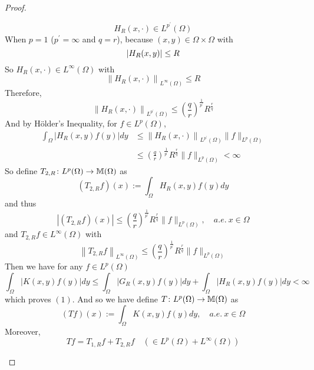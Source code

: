 \begin{proof}
\begin{enumerate}[label=(\Roman*)]
		\begin{equation*}
			H_R(x, \cdot) \in L^{p^{\prime}}(\Omega)
		\end{equation*}
		When $p = 1$ ($p^\prime = \infty$ and $q = r$), because $(x,y) \in \Omega \times \Omega$ with
		\begin{equation*}
			\left\lvert H_R(x,y)\right\lvert \leq R
		\end{equation*}
		So $H_R(x, \cdot) \in L^{\infty}(\Omega)$ with
		\begin{equation*}
			\left\|H_R(x, \cdot)\right\|_{L^{\infty}(\Omega)} \leq R
		\end{equation*}
		Therefore, 
		\begin{equation*}
			\left\|H_R(x, \cdot)\right\|_{L^{p^{\prime}}(\Omega)} \leq\left(\frac{q}{r}\right)^{\frac{1}{p^{\prime}}} R^{\frac{r}{q}}
		\end{equation*}
		And by H\"older's Inequality, for $f \in L^p(\Omega)$,
		\begin{equation*}
			\begin{aligned}
				\int_{\Omega}\left|H_R(x, y) f(y)\right| d y & \leq\left\|H_R(x, \cdot)\right\|_{L^{p^{\prime}}(\Omega)}\|f\|_{L^p(\Omega)} \\
				& \leq\left(\frac{q}{r}\right)^{\frac{1}{p^{\prime}}} R^{\frac{r}{q}}\|f\|_{L^p(\Omega)}<\infty
			\end{aligned}
		\end{equation*}
		So define $T_{2,R} \colon L^p(\Omega) \rightarrow \mathbb{M}(\Omega)$ as
		\begin{equation*}
			\left(T_{2, R} f\right)(x):=\int_{\Omega} H_R(x, y) f(y) d y
		\end{equation*}
		and thus
		\begin{equation*}
			\left|\left(T_{2, R} f\right)(x)\right| \leq\left(\frac{q}{r}\right)^{\frac{1}{p^{\prime}}} R^{\frac{r}{q}}\|f\|_{L^p(\Omega)},\quad a.e.~ x \in \Omega
		\end{equation*}
		and $T_{2,R}f \in L^\infty(\Omega)$ with
		\begin{equation*}
			\left\|T_{2, R} f\right\|_{L^{\infty}(\Omega)} \leq\left(\frac{q}{r}\right)^{\frac{1}{p^{\prime}}} R^{\frac{r}{q}}\|f\|_{L^p(\Omega)}
		\end{equation*}
		Then we have for any $f \in L^p(\Omega)$
		\begin{equation*}
			\int_{\Omega}|K(x, y) f(y)| d y \leq \int_{\Omega}\left|G_R(x, y) f(y)\right| d y+\int_{\Omega}\left|H_R(x, y) f(y)\right| d y<\infty
		\end{equation*}
		which proves $(1)$. And so we have define $T \colon L^p(\Omega) \rightarrow \mathbb{M}(\Omega)$ as
		\begin{equation*}
			(T f)(x):=\int_{\Omega} K(x, y) f(y) d y,\quad a.e.~ x \in \Omega
		\end{equation*}
		Moreover,
		\begin{equation*}
			T f=T_{1, R} f+T_{2, R} f \quad\left(\in L^p(\Omega)+L^{\infty}(\Omega)\right)
		\end{equation*}


\end{enumerate}
\end{proof}
